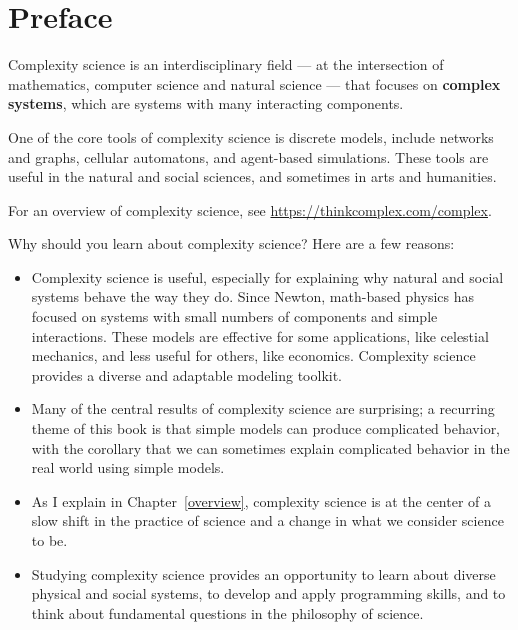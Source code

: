 \documentclass[12pt]{book}
\theoremstyle{exercise}
\begin{document}
\fi

\chapter{Preface}
\label{preface}

Complexity science is an interdisciplinary
field --- at the intersection of mathematics, computer science and
natural science --- that focuses on {\bf complex systems},
which are systems with many interacting components.

One of the core tools of complexity science is discrete models,
include networks and graphs, cellular automatons, and agent-based
simulations.  These tools are useful in the natural and social sciences,
and sometimes in arts and humanities.

For an overview of complexity science, see
\url{https://thinkcomplex.com/complex}.




Why should you learn about complexity science?  Here are a few reasons:

\begin{itemize}

\item Complexity science is useful, especially for explaining why natural and social systems behave the way they do.  Since Newton, math-based physics has focused on systems with small numbers of components and simple interactions.  These models are effective for some applications, like celestial mechanics, and less useful for others, like economics.  Complexity science provides a diverse and adaptable modeling toolkit. 

\item Many of the central results of complexity science are surprising; a recurring theme of this book is that simple models can produce complicated behavior, with the corollary that we can sometimes explain complicated behavior in the real world using simple models.

\item As I explain in Chapter~\ref{overview}, complexity science is at the center of a slow shift in the practice of science and a change in what we consider science to be.

\item Studying complexity science provides an opportunity to learn about diverse physical and social systems, to develop and apply programming skills, and to think about fundamental questions in the philosophy of science.

\end{itemize}
\end{document}
